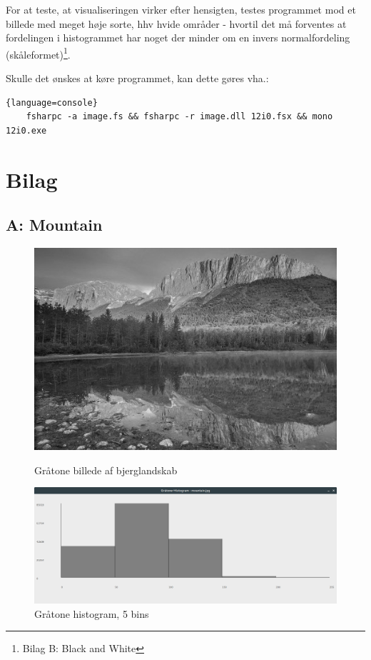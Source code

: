 \documentclass[a4paper,10pt]{article}
\begin{document}
For at teste, at visualiseringen virker efter hensigten, testes programmet mod et billede med meget høje sorte, hhv hvide områder - hvortil det må forventes at fordelingen i histogrammet har noget der minder om en invers normalfordeling (skåleformet)\footnote{Bilag B: Black and White}.

Skulle det ønskes at køre programmet, kan dette gøres vha.:
\begin{lstlisting}{language=console}
	fsharpc -a image.fs && fsharpc -r image.dll 12i0.fsx && mono 12i0.exe
\end{lstlisting}


\newpage

\section*{Bilag}
\subsection*{A: Mountain}

\begin{figure}[H]
  \centering
  \begin{minipage}[b]{0.4\textwidth}
    \includegraphics[width=\textwidth]{mountain_gray.jpg}
    \caption{Gråtone billede af bjerglandskab}
  \end{minipage}
  \hfill
  \begin{minipage}[b]{0.4\textwidth}
    \includegraphics[width=\textwidth]{hist1.png}
    \caption{Gråtone histogram, 5 bins}
  \end{minipage}
\end{figure}
\end{document}
